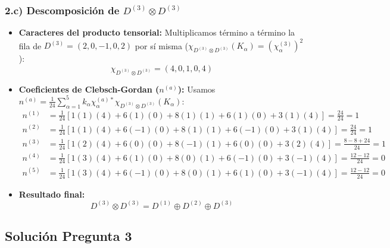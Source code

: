 \documentclass[11pt, a4paper]{article}
\begin{document}
\subsubsection*{2.c) Descomposición de $D^{(3)} \otimes D^{(3)}$}
\begin{itemize}
    \item \textbf{Caracteres del producto tensorial:} Multiplicamos término a término la fila de $D^{(3)} = (2, 0, -1, 0, 2)$ por sí misma ($\chi_{D^{(3)}\otimes D^{(3)}}(K_\alpha) = (\chi_\alpha^{(3)})^2$):
    \[
    \chi_{D^{(3)}\otimes D^{(3)}} = (4, 0, 1, 0, 4)
    \]
    \item \textbf{Coeficientes de Clebsch-Gordan ($n^{(a)}$):} Usamos $n^{(a)} = \frac{1}{24} \sum_{\alpha=1}^5 k_\alpha \chi_\alpha^{(a)*} \chi_{D^{(3)}\otimes D^{(3)}}(K_\alpha)$:
    \begin{align*}
        n^{(1)} &= \frac{1}{24} [1(1)(4) + 6(1)(0) + 8(1)(1) + 6(1)(0) + 3(1)(4)] = \frac{24}{24} = 1 \\
        n^{(2)} &= \frac{1}{24} [1(1)(4) + 6(-1)(0) + 8(1)(1) + 6(-1)(0) + 3(1)(4)] = \frac{24}{24} = 1 \\
        n^{(3)} &= \frac{1}{24} [1(2)(4) + 6(0)(0) + 8(-1)(1) + 6(0)(0) + 3(2)(4)] = \frac{8 - 8 + 24}{24} = 1 \\
        n^{(4)} &= \frac{1}{24} [1(3)(4) + 6(1)(0) + 8(0)(1) + 6(-1)(0) + 3(-1)(4)] = \frac{12 - 12}{24} = 0 \\
        n^{(5)} &= \frac{1}{24} [1(3)(4) + 6(-1)(0) + 8(0)(1) + 6(1)(0) + 3(-1)(4)] = \frac{12 - 12}{24} = 0
    \end{align*}
    \item \textbf{Resultado final:}
    \[
    D^{(3)} \otimes D^{(3)} = D^{(1)} \oplus D^{(2)} \oplus D^{(3)}
    \]
\end{itemize}

\subsection*{Solución Pregunta 3}
\end{document}
